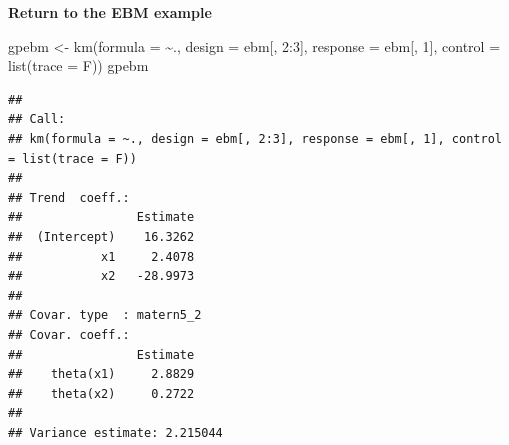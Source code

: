 \documentclass[
  ignorenonframetext,
]{beamer}
\newenvironment{Shaded}{\begin{snugshade}}{\end{snugshade}}
\newcommand{\AttributeTok}[1]{\textcolor[rgb]{0.77,0.63,0.00}{#1}}
\newcommand{\DecValTok}[1]{\textcolor[rgb]{0.00,0.00,0.81}{#1}}
\newcommand{\FunctionTok}[1]{\textcolor[rgb]{0.00,0.00,0.00}{#1}}
\newcommand{\NormalTok}[1]{#1}
\newcommand{\OtherTok}[1]{\textcolor[rgb]{0.56,0.35,0.01}{#1}}
\newcommand{\SpecialCharTok}[1]{\textcolor[rgb]{0.00,0.00,0.00}{#1}}
\begin{document}
\begin{frame}[fragile]{}
\protect\hypertarget{section-48}{}
\textbf{Return to the EBM example}

\begin{Shaded}
\begin{Highlighting}[]
\NormalTok{gpebm }\OtherTok{\textless{}{-}} \FunctionTok{km}\NormalTok{(}\AttributeTok{formula =} \SpecialCharTok{\textasciitilde{}}\NormalTok{., }\AttributeTok{design =}\NormalTok{ ebm[, }\DecValTok{2}\SpecialCharTok{:}\DecValTok{3}\NormalTok{], }\AttributeTok{response =}\NormalTok{ ebm[, }\DecValTok{1}\NormalTok{], }\AttributeTok{control =} \FunctionTok{list}\NormalTok{(}\AttributeTok{trace =}\NormalTok{ F))}
\NormalTok{gpebm}
\end{Highlighting}
\end{Shaded}

\begin{verbatim}
## 
## Call:
## km(formula = ~., design = ebm[, 2:3], response = ebm[, 1], control = list(trace = F))
## 
## Trend  coeff.:
##                Estimate
##  (Intercept)    16.3262
##           x1     2.4078
##           x2   -28.9973
## 
## Covar. type  : matern5_2 
## Covar. coeff.:
##                Estimate
##    theta(x1)     2.8829
##    theta(x2)     0.2722
## 
## Variance estimate: 2.215044
\end{verbatim}
\end{frame}
\end{document}
